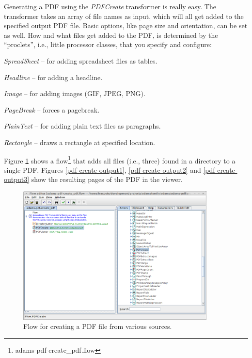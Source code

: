 \documentclass[a4paper]{book}
\begin{document}
Generating a PDF using the \textit{PDFCreate} transformer is really easy.
The transformer takes an array of file names as input, which will all get added
to the specified output PDF file. Basic options, like page size and orientation,
can be set as well. How and what files get added to the PDF, is determined by
the ``proclets'', i.e., little processor classes, that you specify and configure:
\begin{tight_itemize}
	\item \textit{SpreadSheet} -- for adding spreadsheet files as tables.
	\item \textit{Headline} -- for adding a headline.
	\item \textit{Image} -- for adding images (GIF, JPEG, PNG).
	\item \textit{PageBreak} -- forces a pagebreak.
	\item \textit{PlainText} -- for adding plain text files as paragraphs.
	\item \textit{Rectangle} -- draws a rectangle at specified location.
\end{tight_itemize}

Figure \ref{pdf-create-flow} shows a flow\footnote{adams-pdf-create\_pdf.flow} 
that adds all files (i.e., three) found in a directory to a single PDF. 
Figures \ref{pdf-create-output1}, \ref{pdf-create-output2} and 
\ref{pdf-create-output3} show the resulting pages of the PDF in the viewer.

\begin{figure}[htb]
  \centering
  \includegraphics[width=10.0cm]{images/pdf-create-flow.png}
  \caption{Flow for creating a PDF file from various sources.}
  \label{pdf-create-flow}
\end{figure}
\end{document}
